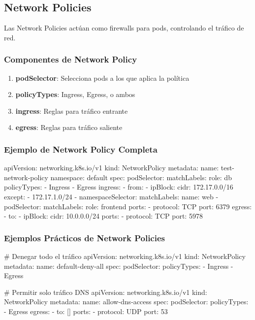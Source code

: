 \documentclass[11pt,a4paper]{article}
\begin{document}
\subsection{Network Policies}

Las Network Policies actúan como firewalls para pods, controlando el tráfico de red.

\subsubsection{Componentes de Network Policy}

\begin{enumerate}
    \item \textbf{podSelector}: Selecciona pods a los que aplica la política
    \item \textbf{policyTypes}: Ingress, Egress, o ambos
    \item \textbf{ingress}: Reglas para tráfico entrante
    \item \textbf{egress}: Reglas para tráfico saliente
\end{enumerate}

\subsubsection{Ejemplo de Network Policy Completa}

\begin{commandbox}
apiVersion: networking.k8s.io/v1
kind: NetworkPolicy
metadata:
  name: test-network-policy
  namespace: default
spec:
  podSelector:
    matchLabels:
      role: db
  policyTypes:
  - Ingress
  - Egress
  ingress:
  - from:
    - ipBlock:
        cidr: 172.17.0.0/16
        except:
        - 172.17.1.0/24
    - namespaceSelector:
        matchLabels:
          name: web
    - podSelector:
        matchLabels:
          role: frontend
    ports:
    - protocol: TCP
      port: 6379
  egress:
  - to:
    - ipBlock:
        cidr: 10.0.0.0/24
    ports:
    - protocol: TCP
      port: 5978
\end{commandbox}

\subsubsection{Ejemplos Prácticos de Network Policies}

\begin{commandbox}
\# Denegar todo el tráfico
apiVersion: networking.k8s.io/v1
kind: NetworkPolicy
metadata:
  name: default-deny-all
spec:
  podSelector: {}
  policyTypes:
  - Ingress
  - Egress

\# Permitir solo tráfico DNS
apiVersion: networking.k8s.io/v1
kind: NetworkPolicy
metadata:
  name: allow-dns-access
spec:
  podSelector: {}
  policyTypes:
  - Egress
  egress:
  - to: []
    ports:
    - protocol: UDP
      port: 53
\end{commandbox}
\end{document}
